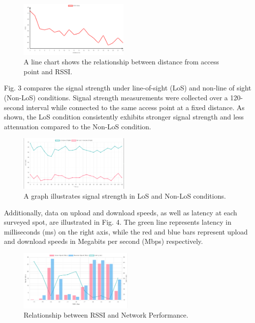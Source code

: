 \documentclass[conference]{IEEEtran}
\begin{document}
\begin{figure}[htbp]
    \centering
    \includegraphics[width=0.48\textwidth]{fig2_rssi.png}
    \caption{A line chart shows the relationship between distance from access point and RSSI.}
\end{figure}

Fig. 3 compares the signal strength under line-of-sight (LoS) and non-line of sight (Non-LoS) conditions. Signal strength measurements were collected over a 120-second interval while connected to the same access point at a fixed distance. As shown, the LoS condition consistently exhibits stronger signal strength and less attenuation compared to the Non-LoS condition.

\begin{figure}[htbp]
    \centering
    \includegraphics[width=0.48\textwidth]{fig3_los_nonlos.png}
    \caption{A graph illustrates signal strength in LoS and Non-LoS conditions.}
    \label{fig:los_nonlos}
\end{figure}

Additionally, data on upload and download speeds, as well as latency at each surveyed spot, are illustrated in Fig. 4. The green line represents latency in milliseconds (ms) on the right axis, while the red and blue bars represent upload and download speeds in Megabits per second (Mbps) respectively.

\begin{figure}[htbp]
    \centering
    \includegraphics[width=0.5\textwidth]{fig4_speed_test.png}
    \caption{Relationship between RSSI and Network Performance.}
\end{figure}
\end{document}
